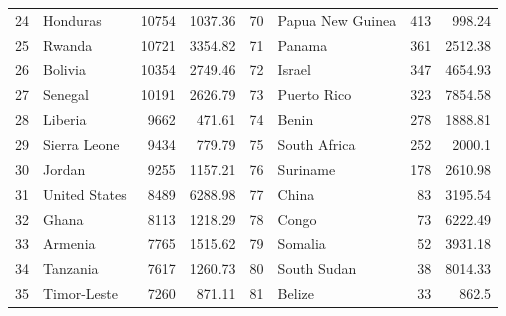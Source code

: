 \begin{longtable}{|c|l|r|r|c|l|r|r|}
	24          & Honduras              & 10754                  & 1037.36                         & 70          & Papua New Guinea      & 413                    & 998.24                          \\
	25          & Rwanda                & 10721                  & 3354.82                         & 71          & Panama                & 361                    & 2512.38                         \\
	26          & Bolivia               & 10354                  & 2749.46                         & 72          & Israel                & 347                    & 4654.93                         \\
	27          & Senegal               & 10191                  & 2626.79                         & 73          & Puerto Rico           & 323                    & 7854.58                         \\
	28          & Liberia               & 9662                   & 471.61                          & 74          & Benin                 & 278                    & 1888.81                         \\
	29          & Sierra Leone          & 9434                   & 779.79                          & 75          & South Africa          & 252                    & 2000.1                          \\
	30          & Jordan                & 9255                   & 1157.21                         & 76          & Suriname              & 178                    & 2610.98                         \\
	31          & United States         & 8489                   & 6288.98                         & 77          & China                 & 83                     & 3195.54                         \\
	32          & Ghana                 & 8113                   & 1218.29                         & 78          & Congo                 & 73                     & 6222.49                         \\
	33          & Armenia               & 7765                   & 1515.62                         & 79          & Somalia               & 52                     & 3931.18                         \\
	34          & Tanzania              & 7617                   & 1260.73                         & 80          & South Sudan           & 38                     & 8014.33                         \\
	35          & Timor-Leste           & 7260                   & 871.11                          & 81          & Belize                & 33                     & 862.5                           \\

\end{longtable}
